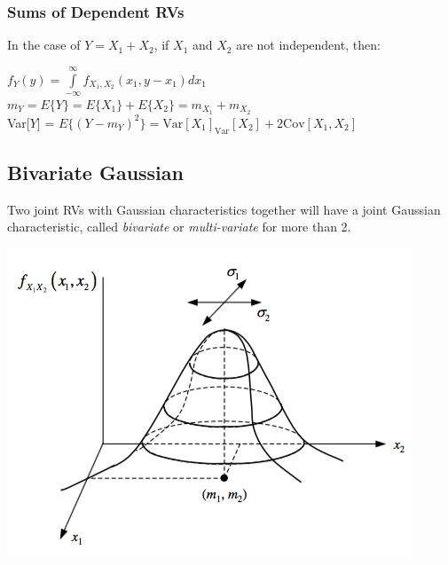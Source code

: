 \documentclass[11pt]{article}
\begin{document}
\subsubsection{Sums of Dependent RVs}

In the case of $Y = X_1 + X_2$, if $X_1$ and $X_2$ are not independent, then:

\begin{center}
$f_Y(y) = \int\limits^{\infty}_{-\infty}f_{X_1,X_2}(x_1,y - x_1)dx_1$ \\

$m_Y = E\{Y\} = E\{X_1\} + E\{X_2\} = m_{X_1} + m_{X_2}$ \\

Var[$Y$] = $E\{(Y - m_Y)^2\} = \text{Var}[X_1] _ \text{Var}[X_2] + 2\text{Cov}[X_1,X_2]$
\end{center}



\subsection{Bivariate Gaussian}

Two joint RVs with Gaussian characteristics together will have a joint Gaussian characteristic, called \textit{bivariate} or \textit{multi-variate} for more than 2.

\begin{center}
    \includegraphics[width=300 px]{img/bivariate}  \\
\end{center}
\end{document}
